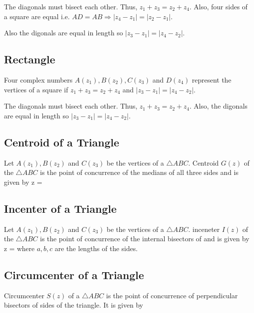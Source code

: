 \startplacefigure[title={Square}]
\stopplacefigure

The diagonals must bisect each other. Thus, $z_1 + z_3 = z_2 + z_4.$ Also, four sides of a square are equal i.e. $AD = AB
\Rightarrow |z_4 - z_1| = |z_2 - z_1|$.

Also the digonals are equal in length so $|z_3 - z_1| = |z_4 - z_2|$.

\subsection{Rectangle}
Four complex numbers $A(z_1), B(z_2), C(z_3)$ and $D(z_4)$ represent the vertices of a square if $z_1 + z_3 = z_2 + z_4$ and $|z_3
- z_1| = |z_4 - z_2|$.

\startplacefigure[title={Rectangle}]
\stopplacefigure

The diagonals must bisect each other. Thus, $z_1 + z_3 = z_2 + z_4$. Also, the digonals are equal in length so $|z_3 - z_1| = |z_4
- z_2|$.

\subsection{Centroid of a Triangle}
Let $A(z_1), B(z_2)$ and $C(z_3)$ be the vertices of a $\triangle ABC.$ Centroid $G(z)$ of the $\triangle ABC$ is the point of
concurrence of the medians of all three sides and is given by
\startformula z = \stopformula

\startplacefigure[title={Centroid of a triangle.}]
\stopplacefigure

\subsection{Incenter of a Triangle}
Let $A(z_1), B(z_2)$ and $C(z_3)$ be the vertices of a $\triangle ABC.$ inceneter $I(z)$ of the $\triangle ABC$ is the point of
concurrence of the internal bisectors of and is given by
\startformula z = \stopformula
where $a, b, c$ are the lengths of the sides.

\subsection{Circumcenter of a Triangle}
Circumcenter $S(z)$ of a $\triangle ABC$ is the point of concurrence of perpendicular bisectors of sides of the triangle. It is
given by

